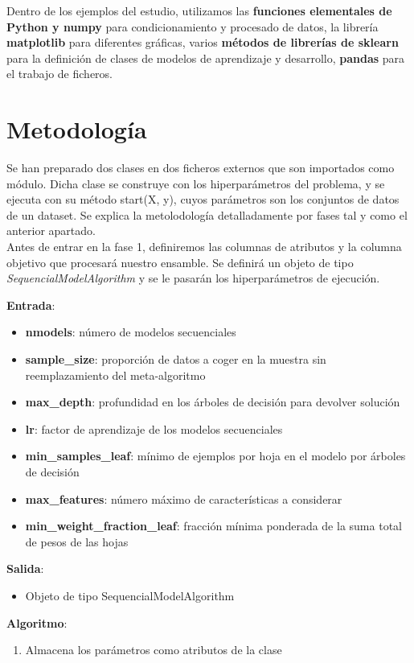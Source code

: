 \documentclass[conference,a4paper]{IEEEtran}
\begin{document}
Dentro de los ejemplos del estudio, utilizamos las \textbf{funciones elementales de Python y numpy} \cite{b18} para condicionamiento y procesado de datos, la librería \textbf{matplotlib} \cite{b19} para diferentes gráficas, varios \textbf{métodos de librerías de sklearn} \cite{b1, b2, b3, b4, b11, b12, b13, b14, b15, b16, b17} para la definición de clases de modelos de aprendizaje y desarrollo, \textbf{pandas} \cite{b20} para el trabajo de ficheros. \\


\section{Metodología}

Se han preparado dos clases en dos ficheros externos que son importados como módulo. Dicha clase se construye con los hiperparámetros del problema, y se ejecuta con su método start(X, y), cuyos parámetros son los conjuntos de datos de un dataset. Se explica la metolodología detalladamente por fases tal y como el anterior apartado. \\

Antes de entrar en la fase 1, definiremos las columnas  de atributos y la columna objetivo que procesará nuestro ensamble. Se definirá un objeto de tipo \textit{SequencialModelAlgorithm} y se le pasarán los hiperparámetros de ejecución.

\begin{textb}

\textbf{Entrada}:
    \begin{itemize}
    \item \textbf{nmodels}: número de modelos secuenciales
    \item \textbf{sample\_size}: proporción de datos a coger en la muestra sin reemplazamiento del meta-algoritmo
    \item \textbf{max\_depth}: profundidad en los árboles de decisión para devolver solución
    \item \textbf{lr}: factor de aprendizaje de los modelos secuenciales
    \item \textbf{min\_samples\_leaf}: mínimo de ejemplos por hoja en el modelo por árboles de decisión
    \item \textbf{max\_features}: número máximo de características a considerar
    \item \textbf{min\_weight\_fraction\_leaf}: fracción mínima ponderada de la suma total de pesos de las hojas
\end{itemize}
\textbf{Salida}:
\begin{itemize}
    \item Objeto de tipo SequencialModelAlgorithm
\end{itemize}
\textbf{Algoritmo}:
\begin{enumerate}
    \item Almacena los parámetros como atributos de la clase
\end{enumerate}
\end{textb}
\end{document}
